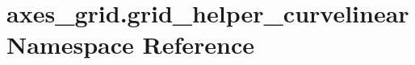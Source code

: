 \hypertarget{namespaceaxes__grid_1_1grid__helper__curvelinear}{}\section{axes\+\_\+grid.\+grid\+\_\+helper\+\_\+curvelinear Namespace Reference}
\label{namespaceaxes__grid_1_1grid__helper__curvelinear}
